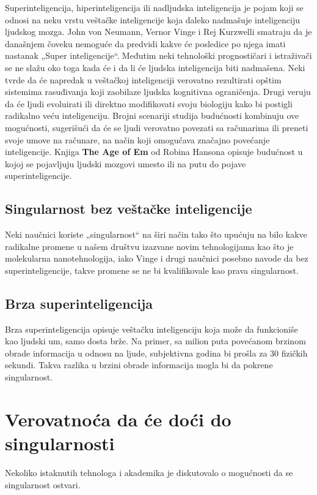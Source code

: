\documentclass[a4paper]{article}
\begin{document}
Superinteligencija, hiperinteligencija ili nadljudska inteligencija je pojam koji se odnosi na neku vrstu veštačke inteligencije koja daleko nadmašuje inteligenciju ljudskog mozga.  John von Neumann, Vernor Vinge i Rej Kurzwelli smatraju da je današnjem čoveku nemoguće da predvidi kakve će posledice po njega imati nastanak „Super inteligencije“.
Međutim neki tehnološki prognostičari i istraživači se ne slažu oko toga kada će i da li će ljudska inteligencija biti nadmašena.  Neki tvrde da će napredak u veštačkoj inteligenciji verovatno rezultirati opštim sistemima rasuđivanja koji zaobilaze ljudska kognitivna ograničenja. Drugi veruju da će ljudi evoluirati ili direktno modifikovati svoju biologiju kako bi postigli radikalno veću inteligenciju.\cite{ref 3}
Brojni scenariji studija budućnosti kombinuju ove mogućnosti, sugerišući da će se ljudi verovatno povezati sa računarima ili preneti svoje umove na računare, na način koji omogućava značajno povećanje inteligencije. Knjiga \textbf{The Age of Em} od Robina Hansona opisuje budućnost u kojoj se pojavljuju ljudski mozgovi umesto ili na putu do pojave superinteligencije.

\subsection{Singularnost bez veštačke inteligencije}

Neki naučnici koriste „singularnost“ na širi način tako što upućuju na bilo kakve radikalne promene u našem društvu izazvane novim tehnologijama kao što je molekularna nanotehnologija,\cite{ref 4} iako Vinge i drugi naučnici posebno navode da bez superinteligencije, takve promene se ne bi kvalifikovale kao prava singularnost.

\subsection{Brza superinteligencija}
Brza superinteligencija opisuje veštačku inteligenciju koja može da funkcioniše kao ljudski um, samo dosta brže. Na primer, sa milion puta povećanom brzinom obrade informacija u odnosu na ljude, subjektivna godina bi prošla za 30 fizičkih sekundi. Takva razlika u brzini obrade informacija mogla bi da pokrene singularnost.

\section{Verovatnoća da će doći do singularnosti}	
\label{sec:verovatnoća}
Nekoliko istaknutih tehnologa i akademika je diskutovalo o mogućnosti da se singularnost ostvari. 
\end{document}
